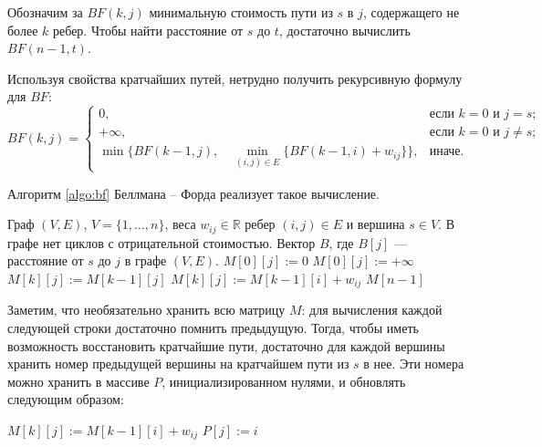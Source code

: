 \documentclass[a4paper,12pt]{article}
\begin{document}
Обозначим за $BF(k, j)$ минимальную стоимость пути из $s$ в $j$, содержащего не более $k$ ребер. Чтобы найти расстояние от $s$ до $t$, достаточно вычислить $BF(n-1, t)$.

Используя свойства кратчайших путей, нетрудно получить рекурсивную формулу для $BF$:
\[BF(k, j) =
	\begin{cases}
		0, & \text{если }k = 0\text{ и }j = s;\\
		+\infty, & \text{если }k = 0\text{ и }j \neq s;\\
		\min \big\{BF(k - 1, j),\quad\min_{(i, j) \in E}\{BF(k - 1, i) + w_{ij}\}\big\}, & \text{иначе}.
	\end{cases}
\]

Алгоритм \ref{algo:bf} Беллмана -- Форда реализует такое вычисление.

\begin{algorithm}
  	\caption{($(V, E), w_{ij}, s$)}
	\label{algo:bf}
	\begin{algorithmic}%
		\Require Граф $(V, E)$, $V = \{1, \dots, n\}$, веса $w_{ij} \in \mathbb{R}$ ребер $(i, j) \in E$ и вершина $s \in V$. В графе нет циклов с отрицательной стоимостью.
		\Ensure Вектор $B$, где $B[j]$ --- расстояние от $s$ до $j$ в графе $(V, E)$.
		\State
				\State $M[0][j] := 0$
			\Else
				\State $M[0][j] := +\infty$
			\EndIf
		\EndFor
		\State
	    			\State $M[k][j] := M[k - 1][j]$
						\State $M[k][j] := M[k - 1][i] + w_{ij}$
					\EndIf
    				\EndFor
			\EndFor
		\EndFor
		\State
		\Return $M[n - 1]$
	\end{algorithmic}
\end{algorithm}

Заметим, что необязательно хранить всю матрицу $M$: для вычисления каждой следующей строки достаточно помнить предыдущую. Тогда, чтобы иметь возможность восстановить кратчайшие пути, достаточно для каждой вершины хранить номер предыдущей вершины на кратчайшем пути из $s$ в нее. Эти номера можно хранить в массиве $P$, инициализированном нулями, и обновлять следующим образом: 
\begin{center}
	\begin{algorithmic}
						\State $M[k][j] := M[k - 1][i] + w_{ij}$
						\State $P[j] := i$
					\EndIf
	\end{algorithmic}
\end{center}
\end{document}
